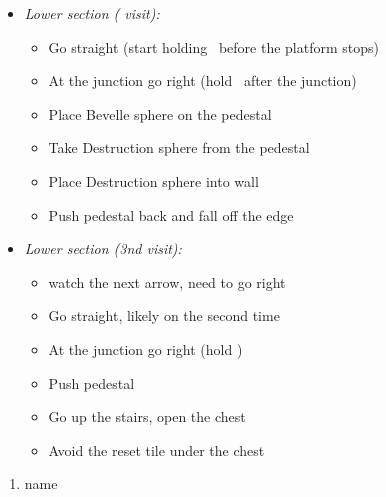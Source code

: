 \begin{trial}
\begin{itemize}
\begin{itemize}
            \item Take Destruction sphere from the new wall
            \item Place Destruction sphere on the pedestal
            \item Take Bevelle sphere from the wall
            \item Push pedestal back and fall off the edge
        \end{itemize}
        \item \textit{Lower section ( visit):}
        \begin{itemize}
            \item Go straight (start holding \Confirm\ before the platform stops)
            \item At the  junction go right (hold \Confirm\ after the  junction)
            \item Place Bevelle sphere on the pedestal
            \item Take Destruction sphere from the pedestal
            \item Place Destruction sphere into wall
            \item Push pedestal back and fall off the edge
        \end{itemize}
        \item \textit{Lower section (3nd visit):}
        \begin{itemize}
            \item watch the next arrow, need to go right
            \item Go straight, likely on the second time
            \item At the  junction go right (hold \Confirm)
            \item Push pedestal
            \item Go up the stairs, open the chest
            \item Avoid the reset tile under the chest
        \end{itemize}
    \end{itemize}
\end{trial}
\begin{enumerate}[resume]
    \item name \bahamut
\end{enumerate}
\wincb\lossnp\bothnp\winnpsingle\lossnpsingle\bothnpsingle
